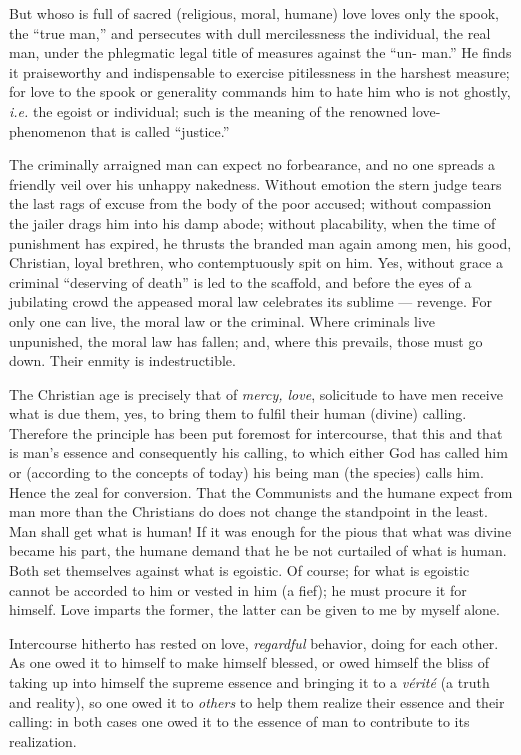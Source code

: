 But whoso is full of sacred (religious, moral, humane) love loves only the 
spook, the ``true man,'' and persecutes with dull mercilessness the 
individual, the real man, under the phlegmatic legal title of measures against 
the ``un- man.'' He finds it praiseworthy and indispensable to exercise 
pitilessness in the harshest measure; for love to the spook or generality 
commands him to hate him who is not ghostly, \textit{i.e.} the egoist or 
individual; such is the meaning of the renowned love-phenomenon that is called 
``justice.''

The criminally arraigned man can expect no forbearance, and no one spreads a 
friendly veil over his unhappy nakedness. Without emotion the stern judge 
tears the last rags of excuse from the body of the poor accused; without 
compassion the jailer drags him into his damp abode; without placability, when 
the time of punishment has expired, he thrusts the branded man again among 
men, his good, Christian, loyal brethren, who contemptuously spit on him. Yes, 
without grace a criminal ``deserving of death'' is led to the scaffold, and 
before the eyes of a jubilating crowd the appeased moral law celebrates its 
sublime --- revenge. For only one can live, the moral law or the criminal. 
Where criminals live unpunished, the moral law has fallen; and, where this 
prevails, those must go down. Their enmity is indestructible.

The Christian age is precisely that of \textit{mercy, love}, solicitude to 
have men receive what is due them, yes, to bring them to fulfil their human 
(divine) calling. Therefore the principle has been put foremost for 
intercourse, that this and that is man's essence and consequently his calling, 
to which either God has called him or (according to the concepts of today) his 
being man (the species) calls him. Hence the zeal for conversion. That the 
Communists and the humane expect from man more than the Christians do does not 
change the standpoint in the least. Man shall get what is human! If it was 
enough for the pious that what was divine became his part, the humane demand 
that he be not curtailed of what is human. Both set themselves against what is 
egoistic. Of course; for what is egoistic cannot be accorded to him or vested 
in him (a fief); he must procure it for himself. Love imparts the former, the 
latter can be given to me by myself alone.

Intercourse hitherto has rested on love, \textit{regardful} behavior, doing 
for each other. As one owed it to himself to make himself blessed, or owed 
himself the bliss of taking up into himself the supreme essence and bringing 
it to a \textit{v\'erit\'e} (a truth and reality), so one owed it to 
\textit{others} to help them realize their essence and their calling: in both 
cases one owed it to the essence of man to contribute to its realization.

